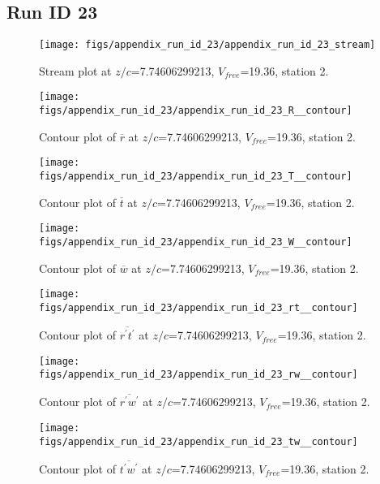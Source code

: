\subsection{Run ID 23}
\begin{figure}[H]
\centering
\texttt{[image: figs/appendix\_run\_id\_23/appendix\_run\_id\_23\_stream]}
\caption{Stream plot at $z/c$=7.74606299213, $V_{free}$=19.36, station 2.}
\label{fig:appendix_run_id_23_stream}
\end{figure}


\begin{figure}[H]
\centering
\texttt{[image: figs/appendix\_run\_id\_23/appendix\_run\_id\_23\_R\_\_contour]}
\caption{Contour plot of $\overline{r}$ at $z/c$=7.74606299213, $V_{free}$=19.36, station 2.}
\label{fig:appendix_run_id_23_R__contour}
\end{figure}


\begin{figure}[H]
\centering
\texttt{[image: figs/appendix\_run\_id\_23/appendix\_run\_id\_23\_T\_\_contour]}
\caption{Contour plot of $\overline{t}$ at $z/c$=7.74606299213, $V_{free}$=19.36, station 2.}
\label{fig:appendix_run_id_23_T__contour}
\end{figure}


\begin{figure}[H]
\centering
\texttt{[image: figs/appendix\_run\_id\_23/appendix\_run\_id\_23\_W\_\_contour]}
\caption{Contour plot of $\overline{w}$ at $z/c$=7.74606299213, $V_{free}$=19.36, station 2.}
\label{fig:appendix_run_id_23_W__contour}
\end{figure}


\begin{figure}[H]
\centering
\texttt{[image: figs/appendix\_run\_id\_23/appendix\_run\_id\_23\_rt\_\_contour]}
\caption{Contour plot of $\overline{r^\prime t^\prime}$ at $z/c$=7.74606299213, $V_{free}$=19.36, station 2.}
\label{fig:appendix_run_id_23_rt__contour}
\end{figure}


\begin{figure}[H]
\centering
\texttt{[image: figs/appendix\_run\_id\_23/appendix\_run\_id\_23\_rw\_\_contour]}
\caption{Contour plot of $\overline{r^\prime w^\prime}$ at $z/c$=7.74606299213, $V_{free}$=19.36, station 2.}
\label{fig:appendix_run_id_23_rw__contour}
\end{figure}


\begin{figure}[H]
\centering
\texttt{[image: figs/appendix\_run\_id\_23/appendix\_run\_id\_23\_tw\_\_contour]}
\caption{Contour plot of $\overline{t^\prime w^\prime}$ at $z/c$=7.74606299213, $V_{free}$=19.36, station 2.}
\label{fig:appendix_run_id_23_tw__contour}
\end{figure}



